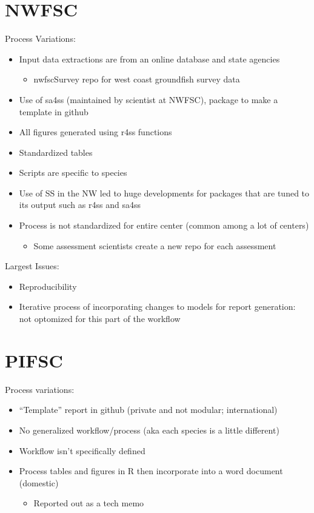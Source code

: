 \documentclass[
  letterpaper,
  oneside,
  open=any]{scrbook}
\providecommand{\tightlist}{%
  \setlength{\itemsep}{0pt}\setlength{\parskip}{0pt}}\usepackage{longtable,booktabs,array}
\begin{document}
\section{NWFSC}\label{sec-nwfsc}

Process Variations:

\begin{itemize}
\item
  Input data extractions are from an online database and state agencies

  \begin{itemize}
  \tightlist
  \item
    nwfscSurvey repo for west coast groundfish survey data
  \end{itemize}
\item
  Use of sa4ss (maintained by scientist at NWFSC), package to make a
  template in github
\item
  All figures generated using r4ss functions
\item
  Standardized tables
\item
  Scripts are specific to species
\item
  Use of SS in the NW led to huge developments for packages that are
  tuned to its output such as r4ss and sa4ss
\item
  Process is not standardized for entire center (common among a lot of
  centers)

  \begin{itemize}
  \tightlist
  \item
    Some assessment scientists create a new repo for each assessment
  \end{itemize}
\end{itemize}

Largest Issues:

\begin{itemize}
\item
  Reproducibility
\item
  Iterative process of incorporating changes to models for report
  generation: not optomized for this part of the workflow
\end{itemize}

\section{PIFSC}\label{sec-pifsc}

Process variations:

\begin{itemize}
\item
  ``Template'' report in github (private and not modular; international)
\item
  No generalized workflow/process (aka each species is a little
  different)
\item
  Workflow isn't specifically defined
\item
  Process tables and figures in R then incorporate into a word document
  (domestic)

  \begin{itemize}
  \tightlist
  \item
    Reported out as a tech memo
  \end{itemize}
\end{itemize}
\end{document}
